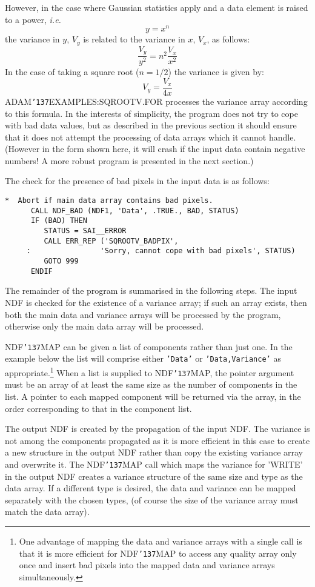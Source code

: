 \documentclass[twoside,11pt]{article}
\renewcommand{\_}{{\tt\char'137}}
\begin{document}
However,  in the case where Gaussian statistics apply and
a data element is raised to a power, {\it i.e.}
$$ y=x^n$$
the variance in $y$, $V_y$ is related to the variance in $x$, $V_x$, as
follows:
$$\frac{V_y}{y^2}=n^2\frac{V_x}{x^2}$$
In the case of taking a square root ($n=1/2$) the variance
is given by:
$$V_y=\frac{V_x}{4x}$$
ADAM\_EXAMPLES:SQROOTV.FOR processes the variance array
according to this formula.
In the interests of simplicity, the program does not try to cope
with bad data values, but as described in
the previous section it should ensure that it does not attempt the
processing of data arrays which it cannot handle.
(However in the form shown here, it will crash if the input data contain
negative numbers! A more robust program is presented in the next section.)

The check for the presence of bad pixels in the input data is as follows:
\begin{verbatim}
*  Abort if main data array contains bad pixels.
      CALL NDF_BAD (NDF1, 'Data', .TRUE., BAD, STATUS)
      IF (BAD) THEN
         STATUS = SAI__ERROR
         CALL ERR_REP ('SQROOTV_BADPIX',
     :                'Sorry, cannot cope with bad pixels', STATUS)
         GOTO 999
      ENDIF
\end{verbatim}
The remainder of the program is summarised in the following steps.
The input NDF is checked for the existence of a variance array;
if such an array exists, then both the main data and variance
arrays will be processed by the program, otherwise only the
main data array  will be processed.

NDF\_MAP can be given a list of components rather than just one.
In the example below the list will comprise either {\tt 'Data'} or
{\tt 'Data,Variance'} as
appropriate.\footnote{One advantage of mapping the data and variance arrays with
a single call is that it is more efficient for NDF\_MAP to access any quality
array only once and insert bad pixels into the mapped data and variance arrays
simultaneously.}
When a list is supplied to NDF\_MAP, the pointer argument must be an array
of at least the same size as the number of components in the list.
A pointer to each mapped component will be returned via the array, in the
order corresponding to that in the component list.

The output NDF is created by the propagation of the input NDF.
The variance is not among the components propagated as it is more efficient
in this case to create a new structure in the output NDF rather
than copy the existing variance array and overwrite it.
The NDF\_MAP call which maps the
variance for 'WRITE' in the output NDF creates a variance structure
of the same size and type as the data array.
If a different type is desired, the data and variance can be mapped
separately with the chosen types, (of course the size of the variance array
must  match the data array).
\end{document}

